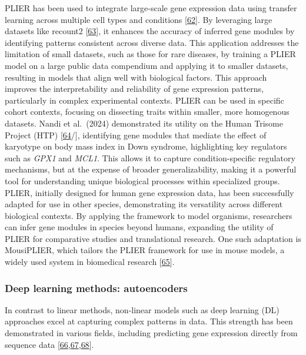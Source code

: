 PLIER has been used to integrate large-scale gene expression data using transfer learning across multiple cell types and conditions {[}\protect\hyperlink{ref-14rnBunuZ}{62}{]}.
By leveraging large datasets like recount2 {[}\protect\hyperlink{ref-GM90STke}{63}{]}, it enhances the accuracy of inferred gene modules by identifying patterns consistent across diverse data.
This application addresses the limitation of small datasets, such as those for rare diseases, by training a PLIER model on a large public data compendium and applying it to smaller datasets, resulting in models that align well with biological factors.
This approach improves the interpretability and reliability of gene expression patterns, particularly in complex experimental contexts.
PLIER can be used in specific cohort contexts, focusing on dissecting traits within smaller, more homogenous datasets.
Nandi et al.~(2024) demonstrated its utility on the Human Trisome Project (HTP) {[}\protect\hyperlink{ref-v5DtVejF}{64}/{]}, identifying gene modules that mediate the effect of karyotype on body mass index in Down syndrome, highlighting key regulators such as \emph{GPX1} and \emph{MCL1}.
This allows it to capture condition-specific regulatory mechanisms, but at the expense of broader generalizability, making it a powerful tool for understanding unique biological processes within specialized groups.
PLIER, initially designed for human gene expression data, has been successfully adapted for use in other species, demonstrating its versatility across different biological contexts.
By applying the framework to model organisms, researchers can infer gene modules in species beyond humans, expanding the utility of PLIER for comparative studies and translational research.
One such adaptation is MousiPLIER, which tailors the PLIER framework for use in mouse models, a widely used system in biomedical research {[}\protect\hyperlink{ref-1CDQw6VDO}{65}{]}.

\hypertarget{deep-learning-methods-autoencoders}{%
\subsubsection{Deep learning methods: autoencoders}\label{deep-learning-methods-autoencoders}}

In contrast to linear methods, non-linear models such as deep learning (DL) approaches excel at capturing complex patterns in data.
This strength has been demonstrated in various fields, including predicting gene expression directly from sequence data {[}\protect\hyperlink{ref-1HNaN8NTb}{66},\protect\hyperlink{ref-CdrNvVBn}{67},\protect\hyperlink{ref-Gy0Zkruj}{68}{]}.

